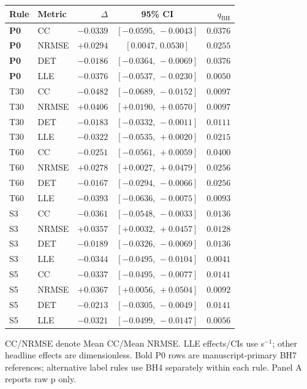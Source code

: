 \documentclass[conference,a4paper]{IEEEtran}
\begin{document}
\begin{table}[!t]
\begin{minipage}[t]{0.49\textwidth}
\begin{tabular*}{\linewidth}{@{\extracolsep{\fill}}llrcr@{}}
\toprule
Rule & Metric & $\Delta$ & 95\% CI & $q_{\mathrm{BH}}$\\
\midrule
\textbf{P0} & CC & $-0.0339$ & $[-0.0595,\,-0.0043]$ & $0.0376$\\
\textbf{P0} & NRMSE & $+0.0294$ & $[0.0047,\,0.0530]$ & $0.0255$\\
\textbf{P0} & DET & $-0.0186$ & $[-0.0364,\,-0.0069]$ & $0.0376$\\
\textbf{P0} & LLE & $-0.0376$ & $[-0.0537,\,-0.0230]$ & $0.0050$\\
T30 & CC & $-0.0482$ & $[-0.0689,\,-0.0152]$ & $0.0097$\\
T30 & NRMSE & $+0.0406$ & $[+0.0190,\,+0.0570]$ & $0.0097$\\
T30 & DET & $-0.0183$ & $[-0.0332,\,-0.0011]$ & $0.0111$\\
T30 & LLE & $-0.0322$ & $[-0.0535,\,+0.0020]$ & $0.0215$\\
T60 & CC & $-0.0251$ & $[-0.0561,\,+0.0059]$ & $0.0400$\\
T60 & NRMSE & $+0.0278$ & $[+0.0027,\,+0.0479]$ & $0.0256$\\
T60 & DET & $-0.0167$ & $[-0.0294,\,-0.0066]$ & $0.0256$\\
T60 & LLE & $-0.0393$ & $[-0.0636,\,-0.0075]$ & $0.0093$\\
S3 & CC & $-0.0361$ & $[-0.0548,\,-0.0033]$ & $0.0136$\\
S3 & NRMSE & $+0.0357$ & $[+0.0032,\,+0.0457]$ & $0.0128$\\
S3 & DET & $-0.0189$ & $[-0.0326,\,-0.0069]$ & $0.0136$\\
S3 & LLE & $-0.0344$ & $[-0.0495,\,-0.0104]$ & $0.0041$\\
S5 & CC & $-0.0337$ & $[-0.0495,\,-0.0077]$ & $0.0141$\\
S5 & NRMSE & $+0.0367$ & $[+0.0056,\,+0.0504]$ & $0.0092$\\
S5 & DET & $-0.0213$ & $[-0.0305,\,-0.0049]$ & $0.0141$\\
S5 & LLE & $-0.0321$ & $[-0.0499,\,-0.0147]$ & $0.0056$\\
\bottomrule
\end{tabular*}
\end{minipage}
\par\smallskip
\raggedright CC/NRMSE denote Mean CC/Mean NRMSE. LLE effects/CIs use s$^{-1}$; other headline effects are dimensionless. Bold P0 rows are manuscript-primary BH7 references; alternative label rules use BH4 separately within each rule. Panel A reports raw p only.

\end{table}
\end{document}
